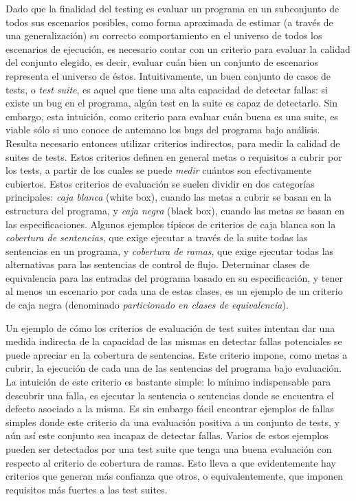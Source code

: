 Dado que la finalidad del testing es evaluar un programa en un subconjunto de todos sus escenarios posibles, como forma aproximada de estimar (a trav\'es de una generalizaci\'on) su correcto comportamiento en el universo de todos los escenarios de ejecuci\'on, es necesario contar con un criterio para evaluar la calidad del conjunto elegido, es decir, evaluar cu\'an bien un conjunto de escenarios representa el universo de \'estos. Intuitivamente, un buen conjunto de casos de tests, o \emph{test suite}, es aquel que tiene una alta capacidad de detectar fallas: si existe un bug en el programa, alg\'un test en la suite es capaz de detectarlo. Sin embargo, esta intuici\'on, como criterio para evaluar cu\'an buena es una suite, es viable s\'olo si uno conoce de antemano los bugs del programa bajo an\'alisis. 
Resulta necesario entonces utilizar criterios indirectos, para medir la calidad de suites de tests. Estos criterios definen en general metas o requisitos a cubrir por los tests, a partir de los cuales se puede \emph{medir} cu\'antos son efectivamente cubiertos. Estos criterios de evaluaci\'on se suelen dividir en dos categor\'ias principales: \emph{caja blanca} (white box), cuando las metas a cubrir se basan en la estructura del programa, y \emph{caja negra} (black box), cuando las metas se basan en las especificaciones. Algunos ejemplos t\'ipicos de criterios de caja blanca son la \emph{cobertura de sentencias}, que exige ejecutar a trav\'es de la suite todas las sentencias en un programa, y \emph{cobertura de ramas}, que exige ejecutar todas las alternativas para las sentencias de control de flujo. Determinar clases de equivalencia para las entradas del programa basado en su especificaci\'on, y tener al menos un escenario por cada una de estas clases, es un ejemplo de un criterio de caja negra (denominado \emph{particionado en clases de equivalencia}).

Un ejemplo de c\'omo los criterios de evaluaci\'on de test suites intentan dar una medida indirecta de la capacidad de las mismas en detectar fallas potenciales se puede apreciar en la cobertura de sentencias. Este criterio impone, como metas a cubrir, la ejecuci\'on de cada una de las sentencias del programa bajo evaluaci\'on. La intuici\'on de este criterio es bastante simple: lo m\'inimo indispensable para descubrir una falla, es ejecutar la sentencia o sentencias donde se encuentra el defecto asociado a la misma. Es sin embargo f\'acil encontrar ejemplos de fallas simples donde este criterio da una evaluaci\'on positiva a un conjunto de tests, y a\'un as\'i este conjunto sea incapaz de detectar fallas. Varios de estos ejemplos pueden ser detectados por una test suite que tenga una buena evaluaci\'on con respecto al criterio de cobertura de ramas. Esto lleva a que evidentemente hay criterios que generan m\'as confianza que otros, o equivalentemente, que imponen requisitos m\'as fuertes a las test suites. 

